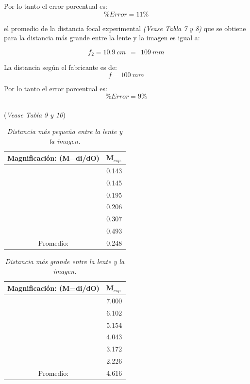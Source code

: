 \documentclass{article}
\begin{document}
Por lo tanto el error porcentual es:
\begin{equation}
    \% Error=11\%
\end{equation}

el promedio de la distancia focal experimental \emph{(Vease Tabla 7 y 8)} que se obtiene para la distancia más grande entre la lente y la imagen es igual a:

\begin{equation}
    f_{2}=10.9 \ cm \ \ = \ \ 109 \ mm
\end{equation}

La distancia según el fabricante es de:
\begin{equation}
    f=100 \ mm
\end{equation}

Por lo tanto el error porcentual es:
\begin{equation}
    \% Error=9\%
\end{equation}


\subsubsection{}
(\emph{Vease Tabla  9 y 10})

\begin{table}[h!]
\begin{center}
\begin{tabular}{ |c|c| } 
 \hline
 Magnificación: (M=di/dO) & M$_{esp.}$\\ 
 \hline
 & 0.143    	\\ 
 & 0.145  	 	\\ 
 & 0.195 	 	\\
 & 0.206 	 	\\
 & 0.307  	 	\\
 & 0.493  	 	\\
 \hline
  Promedio: & 0.248 \\

 \hline
\end{tabular}
\caption{ \emph{Distancia más pequeña entre la lente y la imagen.}}
\label{table:1}
\end{center}
\end{table}

\begin{table}[h!]
\begin{center}
\begin{tabular}{ |c|c| } 
 \hline
 Magnificación: (M=di/dO) & M$_{esp.}$ \\ 
 \hline
 & 7.000 	    \\ 
 & 6.102  	 	\\ 
 & 5.154  	 	\\
 & 4.043  	 	\\
 & 3.172  	 	\\
 & 2.226  	 	\\
 \hline
  Promedio: & 4.616  \\
 \hline
\end{tabular}
\caption{ \emph{Distancia más grande entre la lente y la imagen.}}
\label{table:1}
\end{center}
\end{table}
\end{document}
